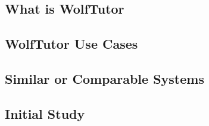 \subsection{What is WolfTutor}
\label{sec:what-wolftutor}


\subsection{WolfTutor Use Cases}
\label{sec:wolftutor-use-cases}


\subsection{Similar or Comparable Systems}
\label{sec:pain-points-with}


\subsection{Initial Study}
\label{sec:initial-study}

